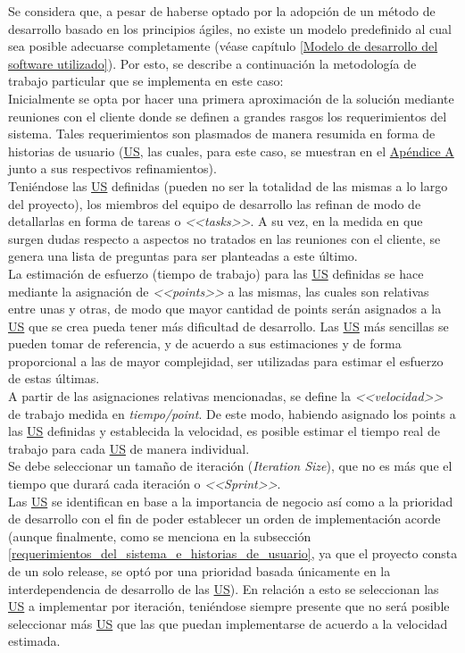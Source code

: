 \documentclass[a4paper, 12pt,twoside]{report}  %
\numberwithin{equation}{subsection} %
\begin{document}
Se considera que, a pesar de haberse optado por la adopción de un método de desarrollo basado en los principios ágiles, no existe un modelo predefinido al cual sea posible adecuarse completamente  (véase capítulo \ref{Modelo de desarrollo del software utilizado}). Por esto, se describe a continuación la metodología de trabajo particular que se implementa en este caso:\\
\indent Inicialmente se opta por hacer una primera aproximación de la solución mediante reuniones con el cliente donde se definen a grandes rasgos los requerimientos del sistema. Tales requerimientos son plasmados de manera resumida en forma de historias de usuario (\hyperlink{US}{US}, las cuales, para este caso, se muestran en el \hyperlink{apendice_a}{Apéndice A} junto a sus respectivos refinamientos).\\
\indent Teniéndose las \hyperlink{US}{US} definidas (pueden no ser la totalidad de las mismas a lo largo del proyecto), los miembros del equipo de desarrollo las refinan de modo de detallarlas en forma de tareas o \textit{<<tasks>>}. A su vez, en la medida en que surgen dudas respecto a aspectos no tratados en las reuniones con el cliente, se genera una lista de preguntas para ser planteadas a este último.\\
\indent La estimación de esfuerzo (tiempo de trabajo) para las \hyperlink{US}{US} definidas se hace mediante la asignación de \textit{<<points>>} a las mismas, las cuales son relativas entre unas y otras, de modo que mayor cantidad de points serán asignados a la \hyperlink{US}{US} que se crea pueda tener más dificultad de desarrollo. Las \hyperlink{US}{US} más sencillas se pueden tomar de referencia, y de acuerdo a sus estimaciones y de forma proporcional a las de mayor complejidad, ser utilizadas para estimar el esfuerzo de estas últimas.\\
\indent A partir de las asignaciones relativas mencionadas, se define la \textit{<<velocidad>>} de trabajo medida en \textit{tiempo/point}. De este modo, habiendo asignado los points a las \hyperlink{US}{US} definidas y establecida la velocidad, es posible estimar el tiempo real de trabajo para cada \hyperlink{US}{US} de manera individual.\\
\indent Se debe seleccionar un tamaño de iteración (\textit{Iteration Size}), que no es más que el tiempo que durará cada iteración o \textit{<<Sprint>>}.\\
\indent Las \hyperlink{US}{US} se identifican en base a la importancia de negocio así como a la prioridad de desarrollo con el fin de poder establecer un orden de implementación acorde (aunque finalmente, como se menciona en la subsección \ref{requerimientos_del_sistema_e_historias_de_usuario}, ya que el proyecto consta de un solo release, se optó por una prioridad basada únicamente en la interdependencia de desarrollo de las \hyperlink{US}{US}). En relación a esto se seleccionan las \hyperlink{US}{US} a implementar por iteración, teniéndose siempre presente que no será posible seleccionar más \hyperlink{US}{US} que las que puedan implementarse de acuerdo a la velocidad estimada.\\
\end{document}
